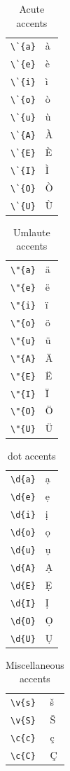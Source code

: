 ﻿\documentclass{article}
\begin{document}
\begin{table}
\begin{center}
\begin{tabular}{ll}
\verb#\`{a}#& \`{a}\\
\verb#\`{e}#& \`{e}\\
\verb#\`{i}#& \`{i}\\
\verb#\`{o}#& \`{o}\\
\verb#\`{u}#& \`{u}\\
\verb#\`{A}#& \`{A}\\
\verb#\`{E}#& \`{E}\\
\verb#\`{I}#& \`{I}\\
\verb#\`{O}#& \`{O}\\
\verb#\`{U}#& \`{U}
\end{tabular}
\caption{Acute accents}
\end{center}
\end{table}

\begin{table}
\begin{center}
\begin{tabular}{ll}
\verb#\"{a}#& \"{a}\\
\verb#\"{e}#& \"{e}\\
\verb#\"{i}#& \"{i}\\
\verb#\"{o}#& \"{o}\\
\verb#\"{u}#& \"{u}\\
\verb#\"{A}#& \"{A}\\
\verb#\"{E}#& \"{E}\\
\verb#\"{I}#& \"{I}\\
\verb#\"{O}#& \"{O}\\
\verb#\"{U}#& \"{U}
\end{tabular}
\caption{Umlaute accents}
\end{center}
\end{table}

\begin{table}
\begin{center}
\begin{tabular}{ll}
\verb#\d{a}#& \d{a}\\
\verb#\d{e}#& \d{e}\\
\verb#\d{i}#& \d{i}\\
\verb#\d{o}#& \d{o}\\
\verb#\d{u}#& \d{u}\\
\verb#\d{A}#& \d{A}\\
\verb#\d{E}#& \d{E}\\
\verb#\d{I}#& \d{I}\\
\verb#\d{O}#& \d{O}\\
\verb#\d{U}#& \d{U}
\end{tabular}
\caption{dot accents}
\end{center}
\end{table}

\begin{table}
\begin{center}
\begin{tabular}{ll}
\verb#\v{s}#& \v{s}\\
\verb#\v{S}#& \v{S}\\
\verb#\c{c}#& \c {c}\\
\verb#\c{C}#& \c {C}
\end{tabular}
\caption{Miscellaneous accents}
\end{center}
\end{table}
\end{document}
